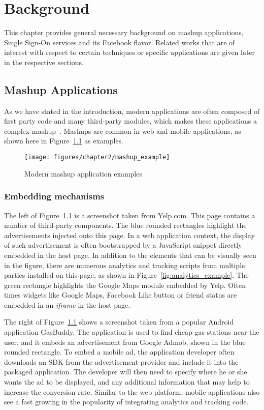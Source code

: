\chapter{Background}

This chapter provides general necessary background on mashup applications, Single Sign-On services and its Facebook flavor.  Related works that are of interest with respect to certain techniques or specific applications are given later in the respective sections.

\section{Mashup Applications}

As we have stated in the introduction, modern applications are often composed of first party code and many third-party modules, which makes these applications a complex mashup~\cite{MashupDef}.  Mashups are common in web and mobile applications, as shown here in Figure~\ref{fig:mashup_example} as examples.

\begin{figure}[bth]
\centering
\texttt{[image: figures/chapter2/mashup\_example]}
\caption{Modern mashup application examples}
\label{fig:mashup_example}
\end{figure}

\subsection{Embedding mechanisms}

The left of Figure~\ref{fig:mashup_example} is a screenshot taken from Yelp.com.  This page contains a number of third-party components.  The blue rounded rectangles highlight the advertisements injected onto this page.  In a web application context, the display of such advertisement is often bootstrapped by a JavaScript snippet directly embedded in the host page.  In addition to the elements that can be visually seen in the figure, there are numerous analytics and tracking scripts from multiple parties installed on this page, as shown in Figure~\ref{fig:analytics_example}.  The green rectangle highlights the Google Maps module embedded by Yelp.  Often times widgets like Google Maps, Facebook Like button or friend status are embedded in an \emph{iframe} in the host page.  

The right of Figure~\ref{fig:mashup_example} shows a screenshot taken from a popular Android application GasBuddy.  The application is used to find cheap gas stations near the user, and it embeds an advertisement from Google Admob, shown in the blue rounded rectangle.  To embed a mobile ad, the application developer often downloads an SDK from the advertisement provider and include it into the packaged application.  The developer will then need to specify where he or she wants the ad to be displayed, and any additional information that may help to increase the conversion rate.  Similar to the web platform, mobile applications also see a fast growing in the popularity of integrating analytics and tracking code.  

